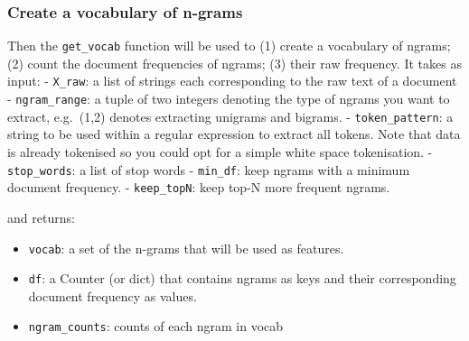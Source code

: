 \documentclass[11pt]{article}
\providecommand{\tightlist}{%
      \setlength{\itemsep}{0pt}\setlength{\parskip}{0pt}}
\begin{document}
    \hypertarget{create-a-vocabulary-of-n-grams}{%
\subsubsection{Create a vocabulary of
n-grams}\label{create-a-vocabulary-of-n-grams}}

Then the \texttt{get\_vocab} function will be used to (1) create a
vocabulary of ngrams; (2) count the document frequencies of ngrams; (3)
their raw frequency. It takes as input: - \texttt{X\_raw}: a list of
strings each corresponding to the raw text of a document -
\texttt{ngram\_range}: a tuple of two integers denoting the type of
ngrams you want to extract, e.g.~(1,2) denotes extracting unigrams and
bigrams. - \texttt{token\_pattern}: a string to be used within a regular
expression to extract all tokens. Note that data is already tokenised so
you could opt for a simple white space tokenisation. -
\texttt{stop\_words}: a list of stop words - \texttt{min\_df}: keep
ngrams with a minimum document frequency. - \texttt{keep\_topN}: keep
top-N more frequent ngrams.

and returns:

\begin{itemize}
\tightlist
\item
  \texttt{vocab}: a set of the n-grams that will be used as features.
\item
  \texttt{df}: a Counter (or dict) that contains ngrams as keys and
  their corresponding document frequency as values.
\item
  \texttt{ngram\_counts}: counts of each ngram in vocab
\end{itemize}
\end{document}
